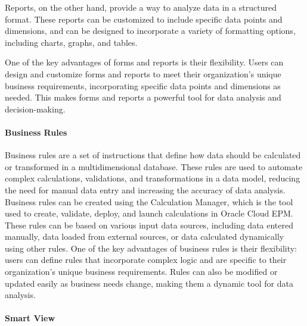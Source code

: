 \documentclass[12pt,a4paper,openright,twoside]{book}
\begin{document}
Reports, on the other hand, provide a way to analyze data in a structured format. 
%
These reports can be customized to include specific data points and dimensions, and can be designed to incorporate a variety of formatting options, including charts, graphs, and tables.

One of the key advantages of forms and reports is their flexibility. 
%
Users can design and customize forms and reports to meet their organization's unique business requirements, incorporating specific data points and dimensions as needed. 
%
This makes forms and reports a powerful tool for data analysis and decision-making.

\paragraph{Business Rules}

Business rules are a set of instructions that define how data should be calculated or transformed in a multidimensional database. 
%
These rules are used to automate complex calculations, validations, and transformations in a data model, reducing the need for manual data entry and increasing the accuracy of data analysis.
%
Business rules can be created using the Calculation Manager, which is the tool used to create, validate, deploy, and launch calculations in Oracle Cloud EPM. 
%
These rules can be based on various input data sources, including data entered manually, data loaded from external sources, or data calculated dynamically using other rules.
%
One of the key advantages of business rules is their flexibility: users can define rules that incorporate complex logic and are specific to their organization's unique business requirements. 
%
Rules can also be modified or updated easily as business needs change, making them a dynamic tool for data analysis.
%


\paragraph{Smart View}
\end{document}
